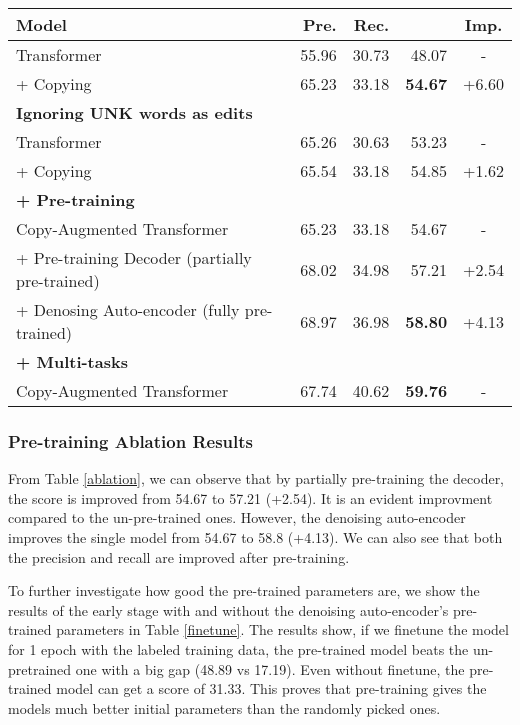 \documentclass[11pt,a4paper]{article}
\begin{document}
\begin{table*}[t!]
\begin{center}
\begin{tabular}{|l|r|r|r|c|}
\hline \bf Model & \bf Pre. & \bf Rec.  & \bf  & \bf Imp. \\ \hline
Transformer & 55.96 & 30.73 & 48.07 & - \\
+ Copying & 65.23 & 33.18 & \bf 54.67 & +6.60 \\

\hline \multicolumn{5}{|l|}{\bf Ignoring UNK words as edits} \\ \hline
Transformer & 65.26 & 30.63 & 53.23 & - \\
+ Copying & 65.54 & 33.18 & 54.85 & +1.62 \\

\hline \multicolumn{5}{|l|}{\bf + Pre-training} \\ \hline
Copy-Augmented Transformer & 65.23 & 33.18 & 54.67 & - \\
+ Pre-training Decoder (partially pre-trained) & 68.02 & 34.98 & 57.21 & +2.54  \\
+ Denosing Auto-encoder (fully pre-trained)& 68.97 & 36.98 & \bf 58.80 & +4.13 \\

\hline \multicolumn{5}{|l|}{\bf + Multi-tasks} \\ \hline
Copy-Augmented Transformer & 67.74 & 40.62 & \bf 59.76 & - \\

\hline
\end{tabular}
\end{center}
\caption{\label{ablation} Single Model Ablation Study on CoNLL 2014 Test Data Set.}
\end{table*}

\subsubsection{Pre-training Ablation Results}
From Table \ref{ablation}, we can observe that by partially pre-training the decoder, the  score is improved from 54.67 to 57.21 (+2.54). It is an evident improvment compared to the un-pre-trained ones. However, the denoising auto-encoder improves the single model from 54.67 to 58.8 (+4.13). We can also see that both the precision and recall are improved after pre-training.

To further investigate how good the pre-trained parameters are, we show the results of the early stage with and without the denoising auto-encoder's pre-trained parameters in Table \ref{finetune}. The results show, if we finetune the model for 1 epoch with the labeled training data, the pre-trained model beats the un-pretrained one with a big gap (48.89 vs 17.19). Even without finetune, the pre-trained model can get a  score of 31.33. This proves that pre-training gives the models much better initial parameters than the randomly picked ones.
\end{document}

